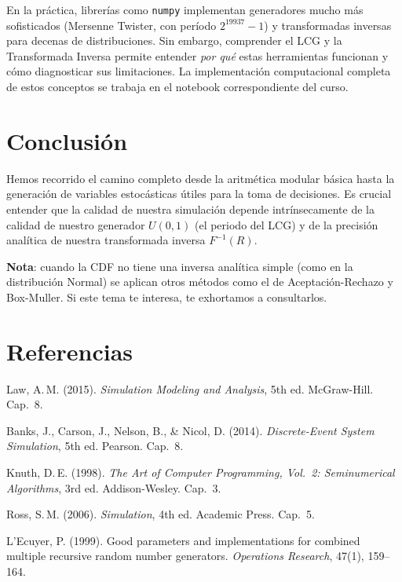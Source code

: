 \documentclass[11pt, letterpaper]{article}
\begin{document}
En la práctica, librerías como \texttt{numpy} implementan generadores mucho más sofisticados (Mersenne Twister, con período $2^{19937}-1$) y transformadas inversas para decenas de distribuciones. Sin embargo, comprender el LCG y la Transformada Inversa permite entender \emph{por qué} estas herramientas funcionan y cómo diagnosticar sus limitaciones. La implementación computacional completa de estos conceptos se trabaja en el notebook correspondiente del curso.

\section{Conclusión}

Hemos recorrido el camino completo desde la aritmética modular básica hasta la generación de variables estocásticas útiles para la toma de decisiones. Es crucial entender que la calidad de nuestra simulación depende intrínsecamente de la calidad de nuestro generador $U(0,1)$ (el periodo del LCG) y de la precisión analítica de nuestra transformada inversa $F^{-1}(R)$.

\textbf{Nota}: cuando la CDF no tiene una inversa analítica simple (como en la distribución Normal) se aplican otros métodos como el de Aceptación-Rechazo y Box-Muller. Si este tema te interesa, te exhortamos a consultarlos.

\section*{Referencias}
\begin{enumerate}[label={[\arabic*]}]
    \item Law, A.\,M. (2015). \textit{Simulation Modeling and Analysis}, 5th ed. McGraw-Hill. Cap.~8.
    \item Banks, J., Carson, J., Nelson, B., \& Nicol, D. (2014). \textit{Discrete-Event System Simulation}, 5th ed. Pearson. Cap.~8.
    \item Knuth, D.\,E. (1998). \textit{The Art of Computer Programming, Vol.~2: Seminumerical Algorithms}, 3rd ed. Addison-Wesley. Cap.~3.
    \item Ross, S.\,M. (2006). \textit{Simulation}, 4th ed. Academic Press. Cap.~5.
    \item L'Ecuyer, P. (1999). Good parameters and implementations for combined multiple recursive random number generators. \textit{Operations Research}, 47(1), 159--164.
\end{enumerate}
\end{document}
